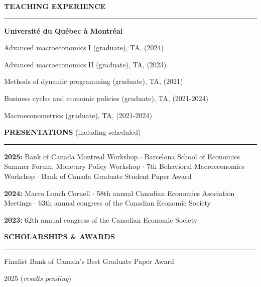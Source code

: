 \documentclass{article}
\begin{document}
	\noindent\textbf{\large TEACHING EXPERIENCE} 
	\vspace{4pt}
	\hrule
	\vspace{6pt} 
	\noindent \textbf{Université du Québec à Montréal}
	
	\noindent Advanced macroeconomics I (graduate), TA, (2024)  %
	\vspace{4pt}
	
	\noindent Advanced macroeconomics II (graduate), TA, (2023)  %
	\vspace{4pt} 
	
	\noindent Methods of dynamic programming (graduate), TA, (2021) %
	\vspace{4pt}
	
	\noindent Business cycles and economic policies (graduate), TA, (2021-2024)
	\vspace{4pt}
	
	\noindent Macroeconometrics (graduate), TA, (2021-2024) %
    \vspace{6pt}
    
	\noindent\textbf{\large PRESENTATIONS} (including scheduled)
	\vspace{4pt}
	\hrule
	\vspace{6pt} 
	\noindent\textbf{2025:} Bank of Canada Montreal Workshop $\cdot$ Barcelona School of Economics Summer Forum, Monetary Policy Workshop $\cdot$ 7th Behavioral Macroeconomics Workshop $\cdot$ Bank of Canada Graduate Student Paper Award
	\vspace{4pt}
	
	\noindent\textbf{2024:} Macro Lunch Cornell $\cdot$ 58th annual Canadian Economics Asociation Meetings $\cdot$ 63th annual congress of the Canadian Economic Society 
	\vspace{4pt}
	
    \noindent\textbf{2023:} 62th annual congress of the Canadian Economic Society  
   \vspace{6pt} 

	\noindent\textbf{\large SCHOLARSHIPS \& AWARDS} %
	\vspace{4pt}
	\hrule
	\vspace{6pt} 
	\noindent\parbox[t]{0.65\textwidth}{Finalist Bank of Canada's Best Graduate Paper Award}%
	\hfill
	2025 (\textit{results pending})\\
	\vspace{4pt}
	
\end{document}
